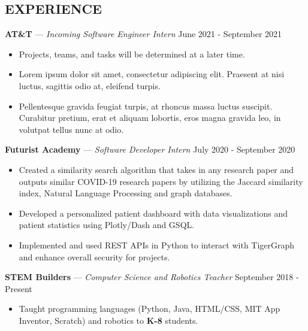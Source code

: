 \documentclass[11pt]{res}
\begin{document}
\begin{footnotesize}
\begin{resume}
\begin{small}
\section{EXPERIENCE}
\end{small}
\vspace{.5mm}
\textbf{AT\&T} — {\sl Incoming Software Engineer Intern} \hfill June 2021 - September 2021\vspace{-4.5mm}
\begin{itemize}[leftmargin=6.25mm] \itemsep -2pt 
\item Projects, teams, and tasks will be determined at a later time. 
\vspace{1.30mm}
\item Lorem ipsum dolor sit amet, consectetur adipiscing elit. Praesent at nisi luctus, sagittis odio at, eleifend turpis.
\vspace{1.30mm}
\item Pellentesque gravida feugiat turpis, at rhoncus massa luctus suscipit. Curabitur pretium, erat et aliquam lobortis, eros magna gravida leo, in volutpat tellus nunc at odio.
\end{itemize}
\vspace{-2.5mm}
\textbf{Futurist Academy} — {\sl Software Developer Intern} \hfill July 2020 - September 2020\vspace{-4.5mm}
\begin{itemize}[leftmargin=6.25mm] \itemsep -2pt 
\item  Created a similarity search algorithm that takes in any research paper and outputs similar COVID-19 research papers by utilizing the Jaccard similarity index, Natural Language Processing and graph databases.
\vspace{1.30mm}
\item Developed a personalized patient dashboard with data visualizations and patient statistics using Plotly/Dash and GSQL.
\vspace{1.30mm}
\item Implemented and used REST APIs in Python to interact with TigerGraph and enhance overall security for projects.
\end{itemize}
\vspace{-2.5mm}
\textbf{STEM Builders} — {\sl Computer Science and Robotics Teacher} \hfill September 2018 - Present\vspace{-4.5mm}
\begin{itemize}[leftmargin=6.25mm] \itemsep -2pt 
\item Taught programming languages (Python, Java, HTML/CSS, MIT App Inventor, Scratch) and robotics to \textbf{K-8} students. 

\end{itemize}
\end{resume}
\end{footnotesize}
\end{document}
